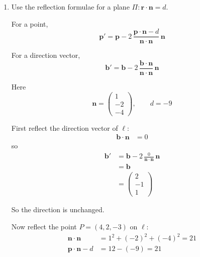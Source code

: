 \documentclass[leqno]{article}
\begin{document}
\begin{enumerate}[
  label=\textbf{\arabic*.},
  leftmargin=*,
  topsep=0pt,
  partopsep=0pt,
  parsep=0pt
]
\begin{tcolorbox}[colback=white, colframe=scarlet, title={\textbf{Solution}}, breakable, grow to left by=6mm, grow to right by=10mm]
\begin{enumerate}[label=\textbf{(\roman*)}]
Also,
\begin{align*}
|\mathbf n|&=\sqrt{1^2+(-2)^2+(-4)^2} \\
&=\sqrt{1+4+16} \\
&=\sqrt{21}
\end{align*}

Therefore
\begin{align*}
\mathrm{dist}&=\frac{|12-(-9)|}{\sqrt{21}} \\
&=\frac{21}{\sqrt{21}} \\
&=\sqrt{21}
\end{align*}

So the distance between \(\ell\) and \(\Pi\) is
\[
\sqrt{21}
\]

  \item Use the reflection formulae for a plane \(\Pi:\mathbf r\cdot \mathbf n=d\).

For a point,
\[
\mathbf p'
=\mathbf p
-2\,\frac{\mathbf p\cdot\mathbf n-d}{\mathbf n\cdot\mathbf n}\,\mathbf n
\]

For a direction vector,
\[
\mathbf b'
=\mathbf b
-2\,\frac{\mathbf b\cdot\mathbf n}{\mathbf n\cdot\mathbf n}\,\mathbf n
\]

Here
\[
\mathbf n=\begin{pmatrix}1\\-2\\-4\end{pmatrix},\qquad d=-9
\]

First reflect the direction vector of \(\ell\):
\begin{align*}
\mathbf b\cdot \mathbf n&=0
\end{align*}
so
\begin{align*}
\mathbf b'
&=\mathbf b-2\,\frac{0}{\mathbf n\cdot\mathbf n}\,\mathbf n \\
&=\mathbf b \\
&=\begin{pmatrix}2\\-1\\1\end{pmatrix}
\end{align*}

So the direction is unchanged.

Now reflect the point \(P=(4,2,-3)\) on \(\ell\):
\begin{align*}
\mathbf n\cdot \mathbf n&=1^2+(-2)^2+(-4)^2=21 \\
\mathbf p\cdot \mathbf n-d&=12-(-9)=21
\end{align*}


\end{enumerate}
\end{tcolorbox}
\end{enumerate}
\end{document}
